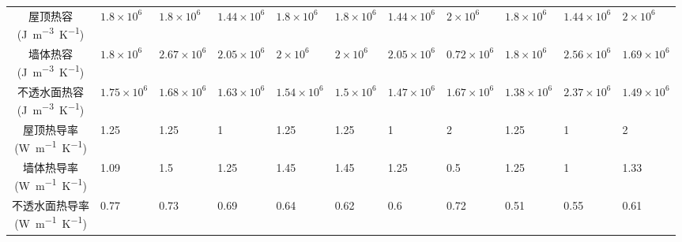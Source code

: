 \begin{landscape}
\begin{table}[htbp]
\begin{tabular}{@{}cllllllllll@{}}
      \makecell{屋顶热容       \\ {(\unit{J.m^{-3}.K^{-1}})}} & $ 1.8\times 10^{6}$  & $ 1.8\times 10^{6}$  & $1.44\times 10^{6}$ & $ 1.8\times 10^{6}$ & $ 1.8\times 10^{6}$ & $ 1.44\times 10^{6}$ & $ 2\times 10^{6}$    & $1.8\times 10^{6}$  & $1.44\times 10^{6}$   & $ 2\times 10^{6}$    \\
      \makecell{墙体热容       \\ {(\unit{J.m^{-3}.K^{-1}})}} & $ 1.8\times 10^{6}$  & $ 2.67\times 10^{6}$ & $2.05\times 10^{6}$ & $ 2\times 10^{6}$   & $ 2\times 10^{6}$   & $ 2.05\times 10^{6}$ & $ 0.72\times 10^{6}$ & $1.8\times 10^{6}$  & $ 2.56\times 10^{6}$  & $ 1.69\times 10^{6}$ \\
      \makecell{不透水面热容   \\ {(\unit{J.m^{-3}.K^{-1}})}} & $ 1.75\times 10^{6}$ & $ 1.68\times 10^{6}$ & $1.63\times 10^{6}$ & $1.54\times 10^{6}$ & $1.5\times 10^{6}$  & $ 1.47\times 10^{6}$ & $ 1.67\times 10^{6}$ & $1.38\times 10^{6}$ & $ 2.37\times 10^{6}$  & $1.49\times 10^{6}$  \\
      \makecell{屋顶热导率     \\ {(\unit{W.m^{-1}.K^{-1}})}} & 1.25                 & 1.25                 & 1                   & 1.25                & 1.25                & 1                    & 2                    & 1.25                & 1                     & 2                    \\
      \makecell{墙体热导率     \\ {(\unit{W.m^{-1}.K^{-1}})}} & 1.09                 & 1.5                  & 1.25                & 1.45                & 1.45                & 1.25                 & 0.5                  & 1.25                & 1                     & 1.33                 \\
      \makecell{不透水面热导率 \\ {(\unit{W.m^{-1}.K^{-1}})}} & 0.77                 & 0.73                 & 0.69                & 0.64                & 0.62                & 0.6                  & 0.72                 & 0.51                & 0.55                  & 0.61                 \\ \bottomrule
    \end{tabular}
  \end{table}
\end{landscape}

